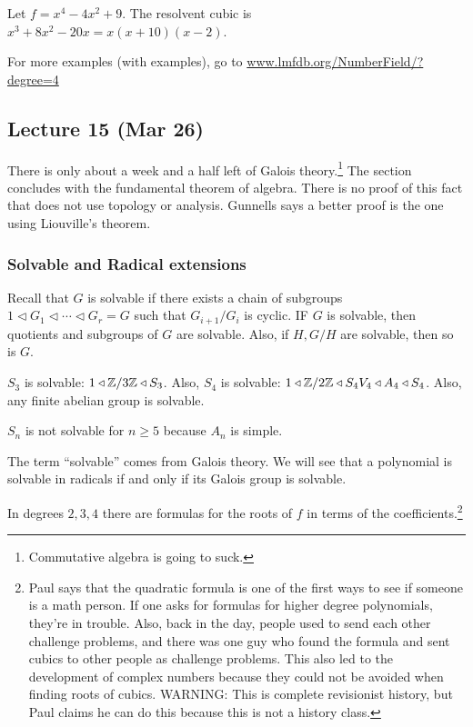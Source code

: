 \documentclass[10pt, twoside]{article}
\begin{document}
        \begin{exm}
            Let $f = x^4 - 4x^2 + 9$. The resolvent cubic is $x^3+8x^2-20x = x(x+10)(x-2)$.
        \end{exm}

        \begin{exm}
            For more examples (with examples), go to \url{www.lmfdb.org/NumberField/?degree=4}
        \end{exm}

        \subsection{Lecture 15 (Mar 26)}
        There is only about a week and a half left of Galois theory.\footnote{Commutative algebra is going to suck.} The section concludes with the fundamental theorem of algebra. There is no proof of this fact that does not use topology or analysis. Gunnells says a better proof is the one using Liouville's theorem.
        
        \subsubsection{Solvable and Radical extensions}
        Recall that $G$ is solvable if there exists a chain of subgroups $1 \triangleleft G_1 \triangleleft \cdots \triangleleft G_r = G$ such that $G_{i+1}/G_i$ is cyclic. IF $G$ is solvable, then quotients and subgroups of $G$ are solvable. Also, if $H,G/H$ are solvable, then so is $G$.

        \begin{exm}
            $S_3$ is solvable: $1 \triangleleft \mathbb{Z}/3\mathbb{Z} \triangleleft S_3$. Also, $S_4$ is solvable: $1 \triangleleft \mathbb{Z}/2\mathbb{Z} \triangleleft S_4 V_4 \triangleleft A_4 \triangleleft S_4$. Also, any finite abelian group is solvable.
        \end{exm}

        \begin{exm}
            $S_n$ is not solvable for $n \geq 5$ because $A_n$ is simple.
        \end{exm}

        The term ``solvable'' comes from Galois theory. We will see that a polynomial is solvable in radicals if and only if its Galois group is solvable.

        \begin{exm}
            In degrees $2,3,4$ there are formulas for the roots of $f$ in terms of the coefficients.\footnote{Paul says that the quadratic formula is one of the first ways to see if someone is a math person. If one asks for formulas for higher degree polynomials, they're in trouble. Also, back in the day, people used to send each other challenge problems, and there was one guy who found the formula and sent cubics to other people as challenge problems. This also led to the development of complex numbers because they could not be avoided when finding roots of cubics. WARNING: This is complete revisionist history, but Paul claims he can do this because this is not a history class.}
        \end{exm}
        
\end{document}
